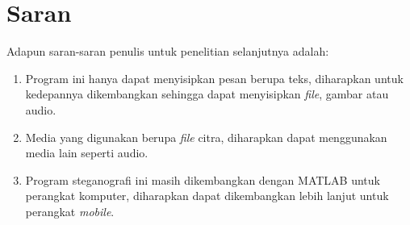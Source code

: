\section{Saran}
Adapun saran-saran penulis untuk penelitian selanjutnya adalah:
\begin{enumerate}
	\item Program ini hanya dapat menyisipkan pesan berupa teks, diharapkan untuk kedepannya dikembangkan sehingga dapat menyisipkan \emph{file}, gambar atau audio.
	
	\item Media yang digunakan berupa \emph{file} citra, diharapkan dapat menggunakan media lain seperti audio.
	
	\item Program steganografi ini masih dikembangkan dengan MATLAB untuk perangkat komputer, diharapkan dapat dikembangkan lebih lanjut untuk perangkat \emph{mobile}. 
	
\end{enumerate}


\begin{comment}

\end{comment}